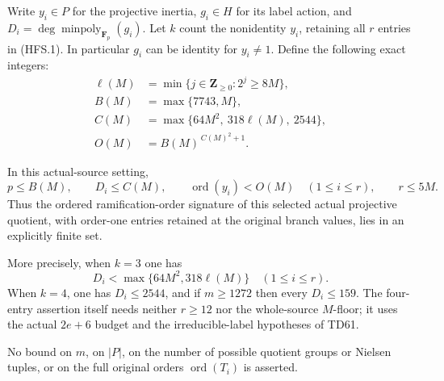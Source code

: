 Write \(y_i\in P\) for the projective inertia, \(g_i\in H\) for its
label action, and \(D_i=\deg\operatorname{minpoly}_{\mathbf F_p}(g_i)\).
Let \(k\) count the nonidentity \(y_i\), retaining all \(r\) entries
in (HFS.1).  In particular \(g_i\) can be identity for \(y_i\ne1\).
Define the following exact integers:
\[
 \begin{split}
 \ell(M)&=\min\{j\in\mathbf Z_{\ge0}:2^j\ge8M\},\\
 B(M)&=\max\{7743,M\},\\
 C(M)&=\max\{64M^2,\ 318\ell(M),\ 2544\},\\
 O(M)&=B(M)^{\,C(M)^2+1}.
 \end{split}
 \tag{HFS.3}
\]

\begin{theorem}[D-TD63]
In this actual-source setting,
\[
 p\le B(M),\qquad D_i\le C(M),\qquad
       \operatorname{ord}(y_i)<O(M)\quad(1\le i\le r),
       \qquad r\le5M.
 \tag{HFS.4}
\]
Thus the ordered ramification-order signature of this selected
actual projective quotient, with order-one entries retained at
the original branch values, lies in an explicitly finite set.

More precisely, when \(k=3\) one has
\[
                D_i<\max\{64M^2,318\ell(M)\}
                    \quad(1\le i\le r).
 \tag{HFS.5}
\]
When \(k=4\), one has \(D_i\le2544\), and if \(m\ge1272\)
then every \(D_i\le159\).
The four-entry assertion itself needs neither \(r\ge12\) nor the
whole-source \(M\)-floor; it uses the actual \(2e+6\) budget and
the irreducible-label hypotheses of TD61.

No bound on \(m\), on \(|P|\), on the number of possible quotient
groups or Nielsen tuples, or on the full original orders
\(\operatorname{ord}(T_i)\) is asserted.
\end{theorem}

